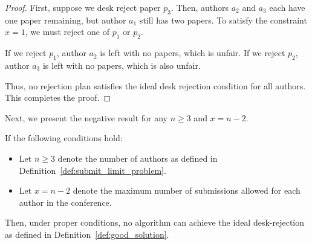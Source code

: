 \begin{proof}
First, suppose we desk reject paper $p_3$. Then, authors $a_2$ and $a_3$ each have one paper remaining, but author $a_1$ still has two papers. To satisfy the constraint $x=1$, we must reject one of $p_1$ or $p_2$.

If we reject $p_1$, author $a_2$ is left with no papers, which is unfair. If we reject $p_2$, author $a_3$ is left with no papers, which is also unfair.

Thus, no rejection plan satisfies the ideal desk rejection condition for all authors. This completes the proof.
\end{proof}

Next, we present the negative result for any $n \geq 3$ and $x = n-2$.

\begin{lemma}[Negative result for any $n \geq 3$ and $x = n-2$] \label{lem:n_geq_3_negative}
If the following conditions hold:
\begin{itemize}
    \item Let $n \ge 3$ denote the number of authors as defined in Definition~\ref{def:submit_limit_problem}.
    \item Let $x=n-2$ denote the maximum number of submissions allowed for each author in the conference. 
\end{itemize}

Then, under proper conditions, no algorithm can achieve the ideal desk-rejection as defined
in Definition~\ref{def:good_solution}.
\end{lemma}

